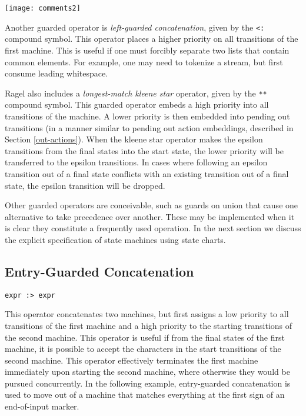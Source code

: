 \documentclass[letterpaper,11pt,oneside]{book}
\newcommand{\verbspace}{\vspace{10pt}}
\newcommand{\graphspace}{\vspace{10pt}}
\begin{document}
\graphspace
\begin{center}
\texttt{[image: comments2]}
\end{center}
\graphspace

Another guarded operator is {\em left-guarded concatenation}, given by the
\verb|<:| compound symbol. This operator places a higher priority on all
transitions of the first machine. This is useful if one must forcibly separate
two lists that contain common elements. For example, one may need to tokenize a
stream, but first consume leading whitespace.

Ragel also includes a {\em longest-match kleene star} operator, given by the
\verb|**| compound symbol. This 
guarded operator embeds a high
priority into all transitions of the machine. 
A lower priority is then embedded into pending out transitions
(in a manner similar to pending out action embeddings, described in Section
\ref{out-actions}).  When the kleene star operator makes the epsilon transitions from
the final states into the start state, the lower priority will be transferred
to the epsilon transitions. In cases where following an epsilon transition
out of a final state conflicts with an existing transition out of a final
state, the epsilon transition will be dropped.

Other guarded operators are conceivable, such as guards on union that cause one
alternative to take precedence over another. These may be implemented when it
is clear they constitute a frequently used operation.
In the next section we discuss the explicit specification of state machines
using state charts.

\subsection{Entry-Guarded Concatenation}

\verb|expr :> expr| 
\verbspace

This operator concatenates two machines, but first assigns a low
priority to all transitions
of the first machine and a high priority to the starting transitions of the
second machine. This operator is useful if from the final states of the first
machine, it is possible to accept the characters in the start transitions of
the second machine. This operator effectively terminates the first machine
immediately upon starting the second machine, where otherwise they would be
pursued concurrently. In the following example, entry-guarded concatenation is
used to move out of a machine that matches everything at the first sign of an
end-of-input marker.
\end{document}
